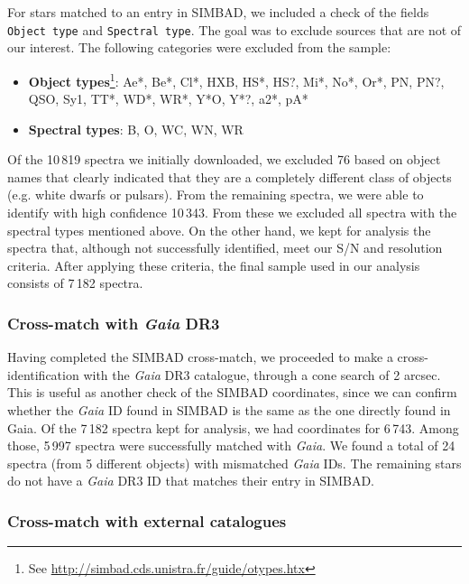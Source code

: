\documentclass{aa}
\begin{document}
For stars matched to an entry in SIMBAD, we included a check of the fields \texttt{Object type} and \texttt{Spectral type}. The goal was to exclude sources that are not of our interest. The following categories were excluded from the sample:

\begin{itemize}
    \item \textbf{Object types}\footnote{See \url{http://simbad.cds.unistra.fr/guide/otypes.htx}}: Ae*, Be*, Cl*, HXB, HS*, HS?, Mi*, No*, Or*, PN, PN?, QSO, Sy1, TT*, WD*, WR*, Y*O, Y*?, a2*, pA*
    \item \textbf{Spectral types}: B, O, WC, WN, WR
\end{itemize}

Of the 10\,819 spectra we initially downloaded, we excluded 76 based on object names that clearly indicated that they are a completely different class of objects (e.g. white dwarfs or pulsars). From the remaining spectra, we were able to identify with high confidence 10\,343. From these we excluded all spectra with the spectral types mentioned above. On the other hand, we kept for analysis the spectra that, although not successfully identified, meet our S/N and resolution criteria. After applying these criteria, the final sample used in our analysis consists of 7\,182 spectra.

\subsubsection{Cross-match with \textit{Gaia} DR3}

Having completed the SIMBAD cross-match, we proceeded to make a cross-identification with the \textit{Gaia} DR3 catalogue, through a cone search of 2 arcsec. This is useful as another check of the SIMBAD coordinates, since we can confirm whether the \textit{Gaia} ID found in SIMBAD is the same as the one directly found in Gaia. Of the 7\,182 spectra kept for analysis, we had coordinates for 6\,743. Among those, 5\,997 spectra were successfully matched with \textit{Gaia}. We found a total of 24 spectra (from 5 different objects) with mismatched \textit{Gaia} IDs. The remaining stars do not have a \textit{Gaia} DR3 ID that matches their entry in SIMBAD.

\subsubsection{Cross-match with external catalogues}
\label{sec:externalcats}
\end{document}
